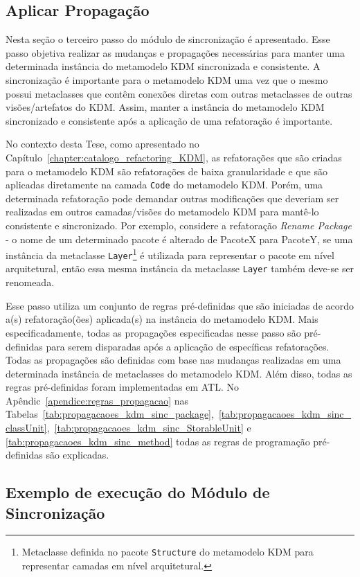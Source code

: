 \subsection{Aplicar Propagação}\label{subsec:aplicar_propagacao_KDM-SInc}
Nesta seção o terceiro passo do módulo de sincronização é apresentado. Esse passo objetiva realizar as mudanças e propagações necessárias para manter uma determinada instância do metamodelo KDM sincronizada e consistente. A sincronização é importante para o metamodelo KDM uma vez que o mesmo possui metaclasses que contêm conexões diretas com outras metaclasses de outras visões/artefatos do KDM. Assim, manter a instância do metamodelo KDM sincronizado e consistente após a aplicação de uma refatoração é importante. 

No contexto desta Tese, como apresentado no Capítulo~\ref{chapter:catalogo_refactoring_KDM}, as refatorações que são criadas para o metamodelo KDM são refatorações de baixa granularidade e que são aplicadas diretamente na camada \texttt{Code} do metamodelo KDM. Porém, uma determinada refatoração pode demandar outras modificações que deveriam ser realizadas em outros camadas/visões do metamodelo KDM para mantê-lo consistente e sincronizado. Por exemplo, considere a refatoração \textit{Rename Package} - o nome de um determinado pacote é alterado de PacoteX para PacoteY, se uma instância da metaclasse \texttt{Layer}\footnote{Metaclasse definida no pacote \texttt{Structure} do metamodelo KDM para representar camadas em nível arquitetural.} é utilizada para representar o pacote em nível arquitetural, então essa mesma instância da metaclasse \texttt{Layer} também deve-se ser renomeada. 

Esse passo utiliza um conjunto de regras pré-definidas que são iniciadas de acordo a(s) refatoração(ões) aplicada(s) na instância do metamodelo KDM. Mais especificadamente, todas as propagações especificadas nesse passo são pré-definidas para serem disparadas após a aplicação de específicas refatorações. Todas as propagações são definidas com base nas mudanças realizadas em uma determinada instância de metaclasses do metamodelo KDM. Além disso, todas as regras pré-definidas foram implementadas em ATL. No Apêndic~\ref{apendice:regras_propagacao} nas Tabelas~\ref{tab:propagacaoes_kdm_sinc_package},~\ref{tab:propagacaoes_kdm_sinc_classUnit},~\ref{tab:propagacaoes_kdm_sinc_StorableUnit} e \ref{tab:propagacaoes_kdm_sinc_method} todas as regras de programação pré-definidas são explicadas.  

\subsection{Exemplo de execução do Módulo de Sincronização}

